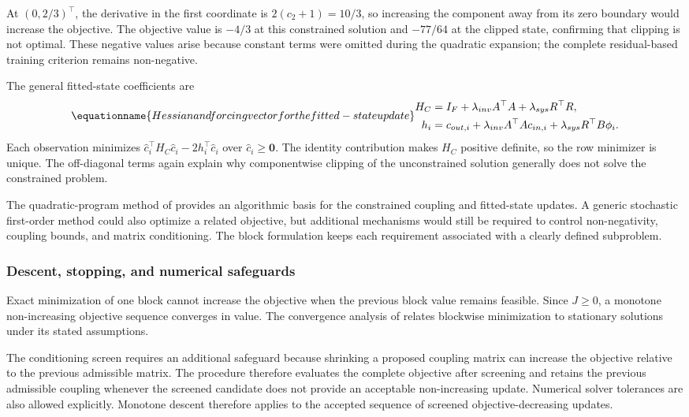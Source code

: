 At \((0,2/3)^\top\), the derivative in the first coordinate is \(2(c_2+1)=10/3\), so increasing the component away from its zero boundary would increase the objective. The objective value is \(-4/3\) at this constrained solution and \(-77/64\) at the clipped state, confirming that clipping is not optimal. These negative values arise because constant terms were omitted during the quadratic expansion; the complete residual-based training criterion remains non-negative.

The general fitted-state coefficients are
\begin{equation}
\equationname{Hessian and forcing vector for the fitted-state update}
\label{eq:icsor_state_update}
\begin{aligned}
H_C&=I_F+\lambda_{inv}A^\top A+\lambda_{sys}R^\top R,\\
h_i&=c_{out,i}+\lambda_{inv}A^\top A c_{in,i}
+\lambda_{sys}R^\top B\phi_i.
\end{aligned}
\end{equation}
Each observation minimizes \(\widehat c_i^\top H_C\widehat c_i-2h_i^\top\widehat c_i\) over \(\widehat c_i\geq\mathbf{0}\). The identity contribution makes \(H_C\) positive definite, so the row minimizer is unique. The off-diagonal terms again explain why componentwise clipping of the unconstrained solution generally does not solve the constrained problem.

The quadratic-program method of \citet{Stellato2018} provides an algorithmic basis for the constrained coupling and fitted-state updates. A generic stochastic first-order method could also optimize a related objective, but additional mechanisms would still be required to control non-negativity, coupling bounds, and matrix conditioning. The block formulation keeps each requirement associated with a clearly defined subproblem.

\subsubsection{Descent, stopping, and numerical safeguards}

Exact minimization of one block cannot increase the objective when the previous block value remains feasible. Since \(J\geq0\), a monotone non-increasing objective sequence converges in value. The convergence analysis of \citet{Razaviyayn2013} relates blockwise minimization to stationary solutions under its stated assumptions.

The conditioning screen requires an additional safeguard because shrinking a proposed coupling matrix can increase the objective relative to the previous admissible matrix. The procedure therefore evaluates the complete objective after screening and retains the previous admissible coupling whenever the screened candidate does not provide an acceptable non-increasing update. Numerical solver tolerances are also allowed explicitly. Monotone descent therefore applies to the accepted sequence of screened objective-decreasing updates.

